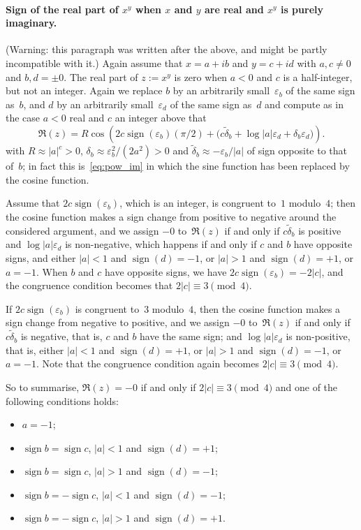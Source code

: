 \documentclass [11pt]{article}
\renewcommand {\epsilon}{\varepsilon}
\newcommand {\sign}{\operatorname{sign}}
\begin{document}
\paragraph{Sign of the real part of $x^y$ when
$x$ and $y$ are real and $x^y$ is purely imaginary.}
(Warning: this paragraph was written after the above, and might be
partly incompatible with it.)
Again assume that $x = a + i b$ and $y = c + i d$ with $a, c \neq 0$
and $b, d = \pm 0$. The real part of $z := x^y$ is zero when
$a < 0$ and $c$ is a half-integer, but not an integer.
Again we replace $b$ by an arbitrarily small~$\epsilon_b$ of the same
sign as~$b$, and $d$ by an arbitrarily small~$\epsilon_d$ of the same
sign as~$d$ and compute as in the case $a<0$ real and $c$ an integer above
that
\[
\Re (z)
= R
\cos \left( 2 c \sign (\epsilon_b) (\pi / 2)
+  \big( c \tilde \delta_b
+ \log |a| \epsilon_d + \delta_b \epsilon_d \big) \right).
\]
with $R \approx |a|^c > 0$,
$\delta_b \approx \epsilon_b^2 / (2 a^2) > 0$ and
$\tilde\delta_b \approx -\epsilon_b / |a|$ of sign opposite to
that of~$b$;
in fact this is~\eqref {eq:pow_im} in which the sine function has
been replaced by the cosine function.

Assume that $2c \sign (\epsilon_b)$, which is an integer, is congruent to~$1$
modulo~$4$; then the cosine function makes a sign change from positive
to negative around the considered argument, and we assign $-0$ to~$\Re (z)$
if and only if $c \tilde \delta_b$ is positive and $\log |a| \epsilon_d$
is non-negative,
which happens if and only if $c$ and $b$ have opposite signs,
and either $|a| < 1$ and $\sign (d) = -1$,
    or     $|a| > 1$ and $\sign (d) = +1$,
    or      $a = -1$.
When $b$ and $c$ have opposite signs, we have $2 c \sign (\epsilon_b) = - 2 |c|$,
and the congruence condition becomes that $2 |c| \equiv 3 \pmod 4$.

If $2c \sign (\epsilon_b)$ is congruent to~$3$ modulo~$4$, then the cosine function
makes a sign change from negative to positive, and we assign $-0$
to~$\Re (z)$ if and only if $c \tilde \delta_b$ is negative, that is,
$c$ and $b$ have the same sign; and $\log |a| \epsilon_d$ is non-positive,
that is,
either $|a| < 1$ and $\sign (d) = +1$,
or     $|a| > 1$ and $\sign (d) = -1$,
or      $a = -1$.
Note that the congruence condition again becomes $2 |c| \equiv 3 \pmod 4$.

So to summarise, $\Re (z) = -0$ if and only if
$2 |c| \equiv 3 \pmod 4$ and one of the following conditions holds:
\begin {itemize}
\item
$a = -1$;
\item
$\sign b = \sign c$, $|a| < 1$ and $\sign (d) = +1$;
\item
$\sign b = \sign c$, $|a| > 1$ and $\sign (d) = -1$;
\item
$\sign b = -\sign c$, $|a| < 1$ and $\sign (d) = -1$;
\item
$\sign b = -\sign c$, $|a| > 1$ and $\sign (d) = +1$.
\end {itemize}
\end{document}
